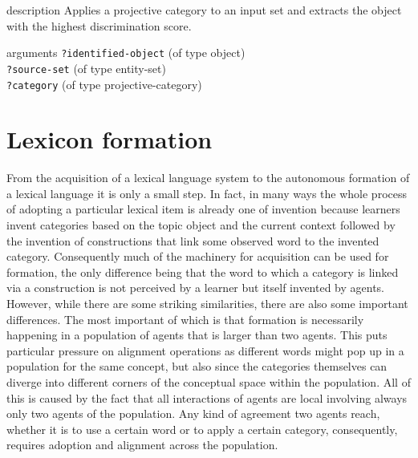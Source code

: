 \begin{explanation}{description}
Applies a projective category to an input set and extracts the 
object with the highest discrimination score.
\end{explanation}
\begin{explanation}{arguments}
{\footnotesize\verb+?identified-object+} (of type object) \\
{\footnotesize\verb+?source-set+} (of type entity-set) \\
{\footnotesize\verb+?category+} (of type projective-category)
\vspace{0.3cm}
\end{explanation}

\section{Lexicon formation}
\label{s:category-formation}
From the acquisition of a lexical language system to the autonomous formation
of a lexical language it is only a small step. In fact, in many ways the 
whole process of adopting a particular lexical item is already one 
of invention because learners invent categories 
based on the topic object and the current context followed by the invention of 
constructions that link some observed word to the invented category. 
Consequently much of the machinery for acquisition can be
used for formation, the only difference being that the word to which a category
is linked via a construction is not perceived by a learner but itself invented by agents. 
However, while there are some striking similarities, there are also some important differences. 
The most important of which is that formation is necessarily happening in a population of agents that
is larger than two agents. This puts particular pressure on alignment operations as 
different words might pop up in a population for the same concept, but also 
since the categories themselves can diverge into different
corners of the conceptual space within the population. All of this is caused by the
fact that all interactions of agents are local involving always only
two agents of the population. Any kind of agreement two agents
reach, whether it is to use a certain word or to apply a certain category, consequently,
requires adoption and alignment across the population.

